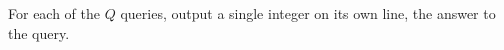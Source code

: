 \documentclass{article}
\begin{document}
For each of the $Q$ queries, output a single integer on its own line, the answer to the query.
\end{document}
